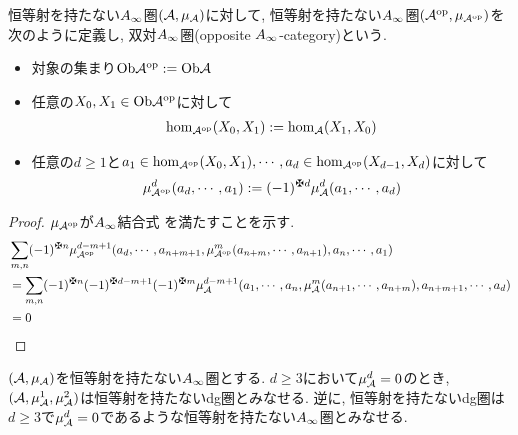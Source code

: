 \documentclass[uplatex, a4paper, 14Q, dvipdfmx]{jsarticle}
\begin{document}
\begin{definition}[双対$\Ainf$圏]
  恒等射を持たない$\Ainf$圏$(\mathcal{A},\mu_{\mathcal{A}})$に対して, 恒等射を持たない$\Ainf$圏$(\mathcal{A}^\mathrm{op},\mu_{\mathcal{A}^\mathrm{op}})$を次のように定義し, 双対$\Ainf$圏(opposite $\Ainf$-category)という. 
  \begin{itemize}
    \item 対象の集まり$\mathrm{Ob}\mathcal{A}^\mathrm{op} := \mathrm{Ob}\mathcal{A}$
    \item 任意の$X_0, X_1 \in \mathrm{Ob}\mathcal{A}^\mathrm{op}$に対して
    \begin{align*}
      \hom_{\mathcal{A}^\mathrm{op}}(X_0,X_1) := \hom_{\mathcal{A}}(X_1,X_0)
    \end{align*}
    \item 任意の$d \geq 1$と$a_1 \in \hom_{\mathcal{A}^\mathrm{op}}(X_0,X_1), \cdots, a_d \in \hom_{\mathcal{A}^\mathrm{op}}(X_{d-1},X_d)$に対して
    \begin{align*}
      \mu^d_{\Aop}(a_d,\cdots,a_1) := (-1)^{\maltese d} \mu^d_\A(a_1,\cdots,a_d)
    \end{align*}
  \end{itemize}
\end{definition}


\begin{proof}  
  $\mu_{\mathcal{A}^\mathrm{op}}$が$\Ainf$結合式
  を満たすことを示す.
  \begin{align*}
    & \sum_{m,n} (-1)^{\maltese n} \mu^{d-m+1}_{\Aop} (a_d,\cdots,a_{n+m+1}, \mu^m_{\Aop}(a_{n+m},\cdots,a_{n+1}), a_n,\cdots,a_1) \\
    & = \sum_{m,n} (-1)^{\maltese n} (-1)^{\maltese d-m+1} (-1)^{\maltese m} 
    \mu^{d-m+1}_\A (a_1,\cdots,a_n, \mu^m_\A(a_{n+1},\cdots,a_{n+m}), a_{n+m+1},\cdots,a_d) \\
    & = 0
  \end{align*}
\end{proof}

\begin{example}
  $(\mathcal{A},\mu_{\mathcal{A}})$を恒等射を持たない$\Ainf$圏とする. 
  $d \geq 3$において$\mu^d_{\mathcal{A}}=0$のとき, $(\mathcal{A},\mu^1_{\mathcal{A}},\mu^2_{\mathcal{A}})$は恒等射を持たないdg圏とみなせる. 
  逆に, 恒等射を持たないdg圏は$d \geq 3$で$\mu^d_{\mathcal{A}}=0$であるような恒等射を持たない$\Ainf$圏とみなせる. 
\end{example}
\end{document}
